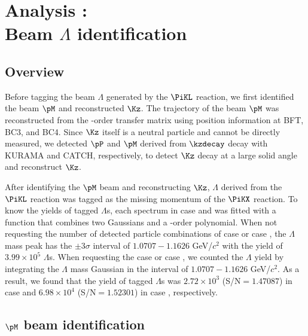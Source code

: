%

\graphicspath{{./pictures/chapter_Lbeam/}}

\chapter{Analysis : \\ Beam $\Lambda$ identification} 
\label{chap-Lbeam}

\section{Overview}
\label{sec-overview}
Before tagging the beam $\Lambda$ generated by the $\PiKL$ reaction, we first identified the beam $\pM$ and reconstructed $\Kz$. The trajectory of the beam $\pM$ was reconstructed from the -order transfer matrix using position information at BFT, BC3, and BC4. Since $\Kz$ itself is a neutral particle and cannot be directly measured, we detected $\pP$ and $\pM$ derived from $\kzdecay$ decay with KURAMA and CATCH, respectively, to detect $\Kz$ decay at a large solid angle and reconstruct $\Kz$.

After identifying the $\pM$ beam and reconstructing $\Kz$, $\Lambda$ derived from the $\PiKL$ reaction was tagged as the missing momentum of the $\PiKX$ reaction. To know the yields of tagged $\Lambda$s, each spectrum in case  and  was fitted with a function that combines two Gaussians and a -order polynomial. When not requesting the number of detected particle combinations of case  or case , the $\Lambda$ mass peak has the $\pm3\sigma$ interval of $1.0707 - 1.1626$ GeV/$c^{2}$ with the yield of $3.99\times10^{5}$ $\Lambda$s. When requesting the case  or case , we counted the $\Lambda$ yield by integrating the $\Lambda$ mass Gaussian in the interval of $1.0707 - 1.1626$ GeV/$c^{2}$. As a result, we found that the yield of tagged $\Lambda$s was $2.72\times10^{3}$ (S/N$=1.47087$) in case  and $6.98\times10^{4}$ (S/N$=1.52301$) in case , respectively. %

\section{$\pM$ beam identification}
